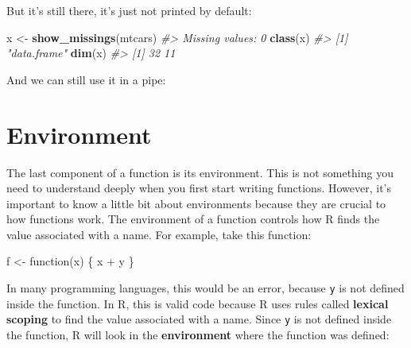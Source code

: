\documentclass[]{book}
\newenvironment{Shaded}{\begin{snugshade}}{\end{snugshade}}
\newcommand{\KeywordTok}[1]{\textcolor[rgb]{0.13,0.29,0.53}{\textbf{{#1}}}}
\newcommand{\DataTypeTok}[1]{\textcolor[rgb]{0.13,0.29,0.53}{{#1}}}
\newcommand{\DecValTok}[1]{\textcolor[rgb]{0.00,0.00,0.81}{{#1}}}
\newcommand{\StringTok}[1]{\textcolor[rgb]{0.31,0.60,0.02}{{#1}}}
\newcommand{\CommentTok}[1]{\textcolor[rgb]{0.56,0.35,0.01}{\textit{{#1}}}}
\newcommand{\OtherTok}[1]{\textcolor[rgb]{0.56,0.35,0.01}{{#1}}}
\newcommand{\NormalTok}[1]{{#1}}
\begin{document}
But it's still there, it's just not printed by default:

\begin{Shaded}
\begin{Highlighting}[]
\NormalTok{x <-}\StringTok{ }\KeywordTok{show_missings}\NormalTok{(mtcars) }
\CommentTok{#> Missing values: 0}
\KeywordTok{class}\NormalTok{(x)}
\CommentTok{#> [1] "data.frame"}
\KeywordTok{dim}\NormalTok{(x)}
\CommentTok{#> [1] 32 11}
\end{Highlighting}
\end{Shaded}

And we can still use it in a pipe:

\begin{Shaded}
\end{Shaded}

\section{Environment}\label{environment}

The last component of a function is its environment. This is not
something you need to understand deeply when you first start writing
functions. However, it's important to know a little bit about
environments because they are crucial to how functions work. The
environment of a function controls how R finds the value associated with
a name. For example, take this function:

\begin{Shaded}
\begin{Highlighting}[]
\NormalTok{f <-}\StringTok{ }\NormalTok{function(x) \{}
  \NormalTok{x +}\StringTok{ }\NormalTok{y}
\NormalTok{\} }
\end{Highlighting}
\end{Shaded}

In many programming languages, this would be an error, because
\texttt{y} is not defined inside the function. In R, this is valid code
because R uses rules called \textbf{lexical scoping} to find the value
associated with a name. Since \texttt{y} is not defined inside the
function, R will look in the \textbf{environment} where the function was
defined:
\end{document}

